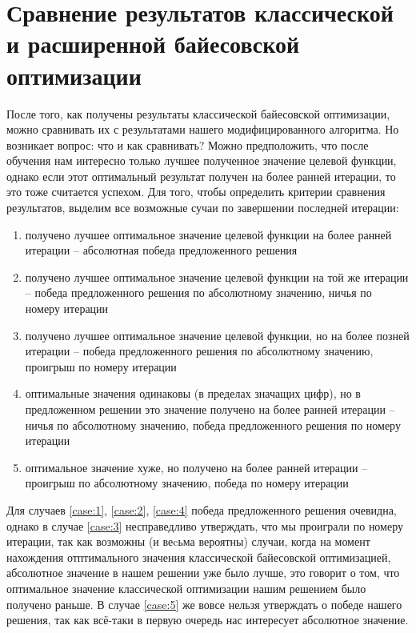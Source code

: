\documentclass[times,specification,annotation]{itmo-student-thesis}
\begin{document}
	\section{Сравнение результатов классической и расширенной байесовской оптимизации}
	После того, как получены результаты классической байесовской оптимизации, можно сравнивать их с результатами нашего модифицированного алгоритма. Но возникает вопрос: что и как сравнивать? Можно предположить, что после обучения нам интересно только лучшее полученное значение целевой функции, однако если этот оптимальный результат получен на более ранней итерации, то это тоже считается успехом. Для того, чтобы определить критерии сравнения результатов, выделим все возможные сучаи по завершении последней итерации:
	\begin{enumerate}
		\item получено лучшее оптимальное значение целевой функции на более ранней итерации -- абсолютная победа предложенного решения \label{case:1}
		\item получено лучшее оптимальное значение целевой функции на той же итерации -- победа предложенного решения по абсолютному значению, ничья по номеру итерации \label{case:2}
		\item получено лучшее оптимальное значение целевой функции, но на более позней итерации -- победа предложенного решения по абсолютному значению, проигрыш по номеру итерации  \label{case:3}
		\item оптимальные значения одинаковы (в пределах значащих цифр), но в предложенном решении это значение получено на более ранней итерации -- ничья по абсолютному значению, победа предложенного решения по номеру итерации \label{case:4}
		\item оптимальное значение хуже, но получено на более ранней итерации -- проигрыш по абсолютному значению, победа по номеру итерации  \label{case:5}
	\end{enumerate} \par

	Для случаев \ref{case:1}, \ref{case:2}, \ref{case:4} победа предложенного решения очевидна, однако в случае \ref{case:3} несправедливо утверждать, что мы проиграли по номеру итерации, так как возможны (и веcьма вероятны) случаи, когда на момент нахождения отптимального значения классической байесовской оптимизацией, абсолютное значение в нашем решении уже было лучше, это говорит о том, что оптимальное значение классической оптимизации нашим решением было получено раньше. В случае \ref{case:5} же вовсе нельзя утверждать о победе нашего решения, так как всё-таки в первую очередь нас интересует абсолютное значение. \par
\end{document}
